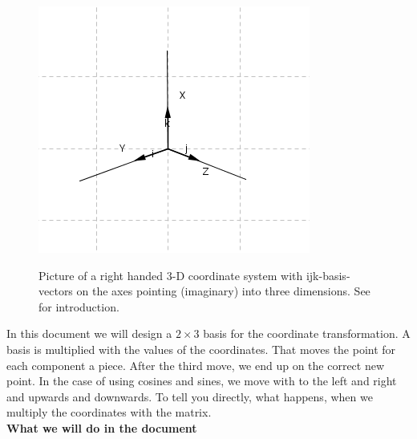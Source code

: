 \documentclass[a4paper]{article}
\begin{document}
\begin{figure}[ht]
\label{ijksystem}
\includegraphics[scale=2]{ijksystem.png}\\
\caption{Picture of a right handed 3-D coordinate system with ijk-basis-vectors on the axes pointing (imaginary)
into three dimensions. See \cite{Corral1} for introduction.}
\end{figure}

In this document we will design a ${2\times{3}}$ basis for the coordinate transformation. 
A basis is multiplied with the values of the coordinates. That moves the point for each 
component a piece. After the third move, we end up on the correct new point.
In the case of using cosines and sines, we move with to the left and right and upwards and downwards. 
To  tell you directly, what happens, when we multiply the coordinates with the matrix. \\

\textbf{What we will do in the document}
\end{document}
